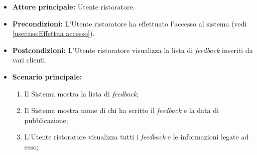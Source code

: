 \label{usecase:Consultazione lista feedback}
\begin{itemize}
	\item \textbf{Attore principale:} Utente ristoratore.

	\item \textbf{Precondizioni:} L'Utente ristoratore ha effettuato l'accesso al sistema (vedi \autoref{usecase:Effettua accesso}).

	\item \textbf{Postcondizioni:} L'Utente ristoratore visualizza la lista di \textit{feedback} inseriti da vari clienti.


	\item \textbf{Scenario principale:}
	      \begin{enumerate}
		      \item Il Sistema mostra la lista di \textit{feedback};
		      \item Il Sistema mostra nome di chi ha scritto il \textit{feedback} e la data di pubblicazione;
		      \item L'Utente ristoratore visualizza tutti i \textit{feedback} e le informazioni legate ad esso;

	      \end{enumerate}
\end{itemize}
